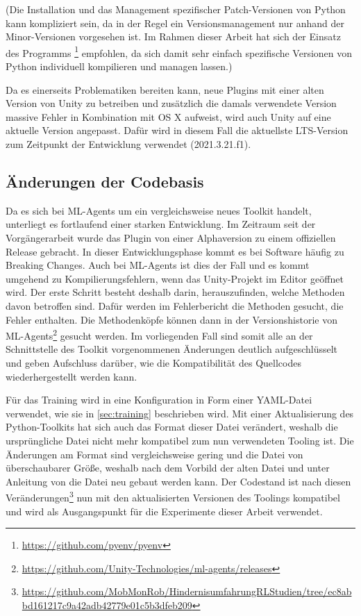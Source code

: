 (Die Installation und das Management spezifischer Patch-Versionen von Python kann kompliziert sein, da in der Regel ein Versionsmanagement nur anhand der Minor-Versionen vorgesehen ist.
Im Rahmen dieser Arbeit hat sich der Einsatz des Programms \footnote{\url{https://github.com/pyenv/pyenv}} empfohlen, da sich damit sehr einfach spezifische Versionen von Python individuell kompilieren und managen lassen.)

Da es einerseits Problematiken bereiten kann, neue Plugins mit einer alten Version von Unity zu betreiben und zusätzlich die damals verwendete Version massive Fehler in Kombination mit OS X aufweist, wird auch Unity auf eine aktuelle Version angepasst.
Dafür wird in diesem Fall die aktuellste LTS-Version zum Zeitpunkt der Entwicklung verwendet (2021.3.21.f1).

\subsection{Änderungen der Codebasis}
Da es sich bei ML-Agents um ein vergleichsweise neues Toolkit handelt, unterliegt es fortlaufend einer starken Entwicklung.
Im Zeitraum seit der Vorgängerarbeit wurde das Plugin von einer Alphaversion zu einem offiziellen Release gebracht.
In dieser Entwicklungsphase kommt es bei Software häufig zu Breaking Changes.
Auch bei ML-Agents ist dies der Fall und es kommt umgehend zu Kompilierungsfehlern, wenn das Unity-Projekt im Editor geöffnet wird.
Der erste Schritt besteht deshalb darin, herauszufinden, welche Methoden davon betroffen sind.
Dafür werden im Fehlerbericht die Methoden gesucht, die Fehler enthalten.
Die Methodenköpfe können dann in der Versionshistorie von ML-Agents\footnote{\url{https://github.com/Unity-Technologies/ml-agents/releases}} gesucht werden.
Im vorliegenden Fall sind somit alle an der Schnittstelle des Toolkit vorgenommenen Änderungen deutlich aufgeschlüsselt und geben Aufschluss darüber, wie die Kompatibilität des Quellcodes wiederhergestellt werden kann.

Für das Training wird in \cite{waidner.2020} eine Konfiguration in Form einer YAML-Datei verwendet, wie sie in \autoref{sec:training} beschrieben wird.
Mit einer Aktualisierung des Python-Toolkits hat sich auch das Format dieser Datei verändert, weshalb die ursprüngliche Datei nicht mehr kompatibel zum nun verwendeten Tooling ist.
Die Änderungen am Format sind vergleichsweise gering und die Datei von überschaubarer Größe, weshalb nach dem Vorbild der alten Datei und unter Anleitung von \cite{mlagentsHyperparameter} die Datei neu gebaut werden kann.
Der Codestand ist nach diesen Veränderungen\footnote{\url{https://github.com/MobMonRob/HindernisumfahrungRLStudien/tree/ec8abbd161217c9a42adb42779e01c5b3dfeb209}} nun mit den aktualisierten Versionen des Toolings kompatibel und wird als Ausgangspunkt für die Experimente dieser Arbeit verwendet.

